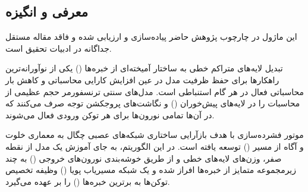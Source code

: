 \subsection{معرفی و انگیزه}
این ماژول در چارچوب پژوهش حاضر پیاده‌سازی و ارزیابی شده و فاقد مقاله مستقل جداگانه در ادبیات تحقیق است.

تبدیل لایه‌های متراکم خطی به ساختار آمیخته‌ای از خبره‌ها () یکی از نوآورانه‌ترین راهکارها برای حفظ ظرفیت مدل در عین افزایش کارایی محاسباتی و کاهش بار محاسباتی فعال در هر گام استنباطی است. مدل‌های سنتی ترنسفورمر حجم عظیمی از محاسبات را در لایه‌های پیش‌خوران () و نگاشت‌های پروجکشن توجه صرف می‌کنند که در آن‌ها تمامی نورون‌ها برای هر توکن ورودی فعال می‌شوند.

موتور فشرده‌سازی  با هدف بازآرایی ساختاری شبکه‌های عصبی چگال به معماری خلوت و آگاه از مسیر () توسعه یافته است. در این الگوریتم، به جای آموزش یک مدل  از نقطه صفر، وزن‌های لایه‌های خطی و  از طریق خوشه‌بندی نورون‌های خروجی () به چند زیرمجموعه متمایز از خبره‌ها افراز شده و یک شبکه مسیریاب پویا () وظیفه تخصیص توکن‌ها به برترین خبره‌ها () را بر عهده می‌گیرد.
